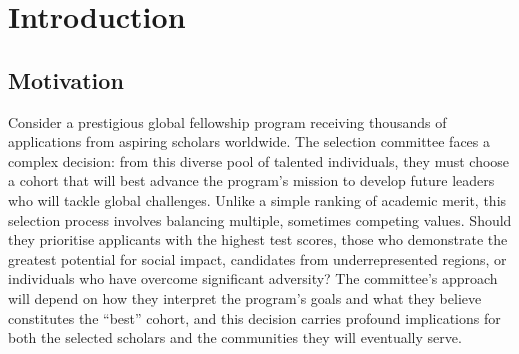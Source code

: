\chapter{\label{ch:intro}Introduction} 


\minitoc

\section{Motivation}


Consider a prestigious global fellowship program receiving thousands of applications from aspiring scholars worldwide. The selection committee faces a complex decision: from this diverse pool of talented individuals, they must choose a cohort that will best advance the program's mission to develop future leaders who will tackle global challenges. Unlike a simple ranking of academic merit, this selection process involves balancing multiple, sometimes competing values. Should they prioritise applicants with the highest test scores, those who demonstrate the greatest potential for social impact, candidates from underrepresented regions, or individuals who have overcome significant adversity? The committee's approach will depend on how they interpret the program's goals and what they believe constitutes the ``best'' cohort, and this decision carries profound implications for both the selected scholars and the communities they will eventually serve.

